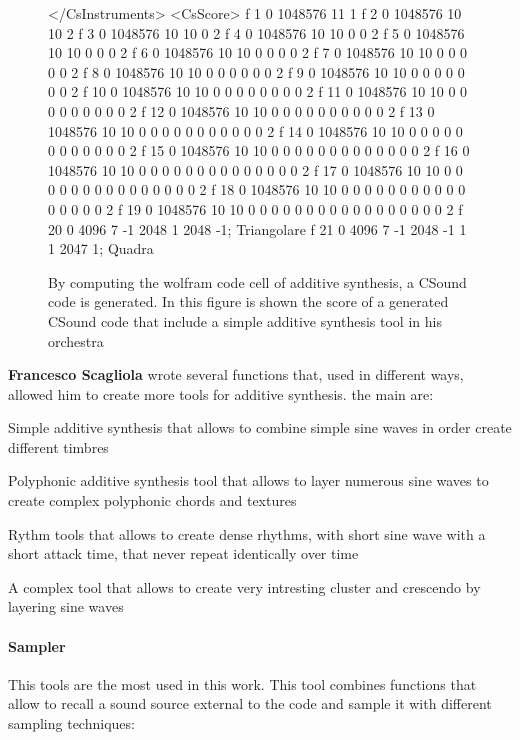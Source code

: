 \begin{figure}[h]
	\begin{code}
</CsInstruments>		
<CsScore>				
f 1 0 1048576 11  1 
f 2 0 1048576 10  10 2
f 3 0 1048576 10  10 0 2
f 4 0 1048576 10  10 0 0 2
f 5 0 1048576 10  10 0 0 0 2
f 6 0 1048576 10  10 0 0 0 0 2
f 7 0 1048576 10  10 0 0 0 0 0 2
f 8 0 1048576 10  10 0 0 0 0 0 0 2
f 9 0 1048576 10  10 0 0 0 0 0 0 0 2
f 10 0 1048576 10 10 0 0 0 0 0 0 0 0 2
f 11 0 1048576 10 10 0 0 0 0 0 0 0 0 0 2
f 12 0 1048576 10 10 0 0 0 0 0 0 0 0 0 0 2
f 13 0 1048576 10 10 0 0 0 0 0 0 0 0 0 0 0 2
f 14 0 1048576 10 10 0 0 0 0 0 0 0 0 0 0 0 0 2
f 15 0 1048576 10 10 0 0 0 0 0 0 0 0 0 0 0 0 0 2
f 16 0 1048576 10 10 0 0 0 0 0 0 0 0 0 0 0 0 0 0 2
f 17 0 1048576 10 10 0 0 0 0 0 0 0 0 0 0 0 0 0 0 0 2
f 18 0 1048576 10 10 0 0 0 0 0 0 0 0 0 0 0 0 0 0 0 0 2
f 19 0 1048576 10 10 0 0 0 0 0 0 0 0 0 0 0 0 0 0 0 0 0 2
f 20 0 4096 7 -1 2048 1 2048 -1; Triangolare
f 21 0 4096 7 -1 2048 -1  1 1  2047 1; Quadra
	\end{code}
	\caption{By computing the wolfram code cell of additive synthesis, a CSound code is generated. In this figure is shown the score of a generated CSound code that include a simple additive synthesis tool in his orchestra}
\end{figure}
		
		\textbf{Francesco Scagliola} wrote several functions that, used in different ways, allowed him to create more tools for additive synthesis. the main are:
		
		\begin{compactitem}
			\item Simple additive synthesis that allows to combine simple sine waves in order create different timbres
			\item Polyphonic additive synthesis tool that allows to layer numerous sine waves to create complex polyphonic chords and textures
			\item Rythm tools that allows to create dense rhythms, with short sine wave with a short attack time, that never repeat identically over time
			\item A complex tool that allows to create very intresting cluster and crescendo by layering sine waves
		\end{compactitem}
		
		\paragraph{Sampler} This tools are the most used in this work.
		This tool combines functions that allow to recall a sound source external to the code and sample it with different sampling techniques:
		
